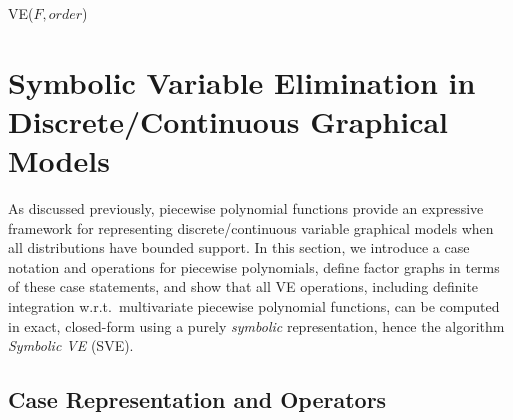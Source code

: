 \documentclass[letterpaper]{article}
\renewcommand{\-}{\text{-}}
\begin{document}
{\begin{algorithm}[hb!]
\BlankLine
{\small
{}
}
\caption{{\sc VE}($F,\mathit{order}$)  \label{alg:varelim}}
\end{algorithm}
\decmargin{1.5em}

\section{Symbolic Variable Elimination in Discrete/Continuous Graphical Models}

As discussed previously, piecewise polynomial functions provide an
expressive framework for representing discrete/continuous variable
graphical models when all distributions have bounded support.  In this
section, we introduce a case notation and operations for piecewise
polynomials, define factor graphs in terms of these case statements,
and show that all VE operations, including definite
integration w.r.t.\ multivariate piecewise polynomial functions, can
be computed in exact, closed-form using a purely \emph{symbolic}
representation, hence the algorithm \emph{Symbolic VE} (SVE).

\subsection{Case Representation and Operators}

}
\end{document}
